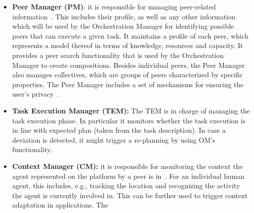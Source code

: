 \begin{itemize}
\item \textbf{Peer Manager (PM)}: it is responsible for managing peer-related information~\cite{D4.3}. This includes their profile, as well as any other information which will be used by the Orchestration Manager for identifying possible peers that can execute a given task.  It maintains a profile of each peer, which
represents a model thereof in terms of knowledge, resources and
capacity. It provides a peer search functionality that is used by the Orchestration Manager to create compositions. Besides individual peers, the Peer Manager also manages collectives, which are groups of peers characterized by specific properties. %
The Peer Manager includes a set of mechanisms for ensuring the user's privacy~\cite{D4.3}.

\item \textbf{Task Execution Manager (TEM):} %
The TEM is in charge of managing the task execution phase. In particular it monitors whether the task execution is in line with expected plan (taken from the task description). In case a deviation is detected, it might trigger a re-planning by using OM's functionality. 

\item \textbf{Context Manager (CM):} it is responsible for monitoring the context the agent represented on the platform by a peer is in~\cite{D3.2}. For an individual human agent, this includes, e.g., tracking the location and recognizing the activity the agent is currently involved in. This can be further used to trigger context adaptation in applications. The %


\end{itemize}
